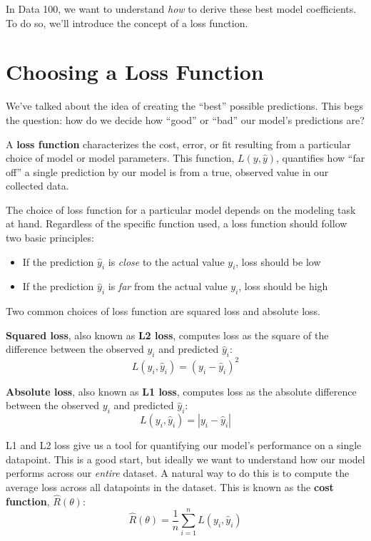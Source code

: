 \documentclass[
  letterpaper,
  DIV=11,
  numbers=noendperiod]{scrreprt}
\providecommand{\tightlist}{%
  \setlength{\itemsep}{0pt}\setlength{\parskip}{0pt}}\usepackage{longtable,booktabs,array}
\begin{document}
In Data 100, we want to understand \emph{how} to derive these best model
coefficients. To do so, we'll introduce the concept of a loss function.

\hypertarget{choosing-a-loss-function}{%
\section{Choosing a Loss Function}\label{choosing-a-loss-function}}

We've talked about the idea of creating the ``best'' possible
predictions. This begs the question: how do we decide how ``good'' or
``bad'' our model's predictions are?

A \textbf{loss function} characterizes the cost, error, or fit resulting
from a particular choice of model or model parameters. This function,
\(L(y, \hat{y})\), quantifies how ``far off'' a single prediction by our
model is from a true, observed value in our collected data.

The choice of loss function for a particular model depends on the
modeling task at hand. Regardless of the specific function used, a loss
function should follow two basic principles:

\begin{itemize}
\tightlist
\item
  If the prediction \(\hat{y}_i\) is \emph{close} to the actual value
  \(y_i\), loss should be low
\item
  If the prediction \(\hat{y}_i\) is \emph{far} from the actual value
  \(y_i\), loss should be high
\end{itemize}

Two common choices of loss function are squared loss and absolute loss.

\textbf{Squared loss}, also known as \textbf{L2 loss}, computes loss as
the square of the difference between the observed \(y_i\) and predicted
\(\hat{y}_i\): \[L(y_i, \hat{y}_i) = (y_i - \hat{y}_i)^2\]

\textbf{Absolute loss}, also known as \textbf{L1 loss}, computes loss as
the absolute difference between the observed \(y_i\) and predicted
\(\hat{y}_i\): \[L(y_i, \hat{y}_i) = |y_i - \hat{y}_i|\]

L1 and L2 loss give us a tool for quantifying our model's performance on
a single datapoint. This is a good start, but ideally we want to
understand how our model performs across our \emph{entire} dataset. A
natural way to do this is to compute the average loss across all
datapoints in the dataset. This is known as the \textbf{cost function},
\(\hat{R}(\theta)\):
\[\hat{R}(\theta) = \frac{1}{n} \sum^n_{i=1} L(y_i, \hat{y}_i)\]
\end{document}
